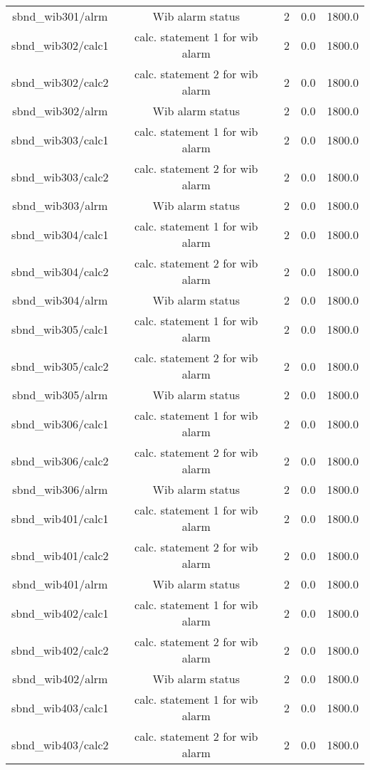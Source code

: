\begin{center}
\begin{longtable}{c | c c c c }
sbnd\_wib301/alrm & Wib alarm status & 2 & 0.0 & 1800.0\\ 
sbnd\_wib302/calc1 & calc. statement 1 for wib alarm & 2 & 0.0 & 1800.0\\ 
sbnd\_wib302/calc2 & calc. statement 2 for wib alarm & 2 & 0.0 & 1800.0\\ 
sbnd\_wib302/alrm & Wib alarm status & 2 & 0.0 & 1800.0\\ 
sbnd\_wib303/calc1 & calc. statement 1 for wib alarm & 2 & 0.0 & 1800.0\\ 
sbnd\_wib303/calc2 & calc. statement 2 for wib alarm & 2 & 0.0 & 1800.0\\ 
sbnd\_wib303/alrm & Wib alarm status & 2 & 0.0 & 1800.0\\ 
sbnd\_wib304/calc1 & calc. statement 1 for wib alarm & 2 & 0.0 & 1800.0\\ 
sbnd\_wib304/calc2 & calc. statement 2 for wib alarm & 2 & 0.0 & 1800.0\\ 
sbnd\_wib304/alrm & Wib alarm status & 2 & 0.0 & 1800.0\\ 
sbnd\_wib305/calc1 & calc. statement 1 for wib alarm & 2 & 0.0 & 1800.0\\ 
sbnd\_wib305/calc2 & calc. statement 2 for wib alarm & 2 & 0.0 & 1800.0\\ 
sbnd\_wib305/alrm & Wib alarm status & 2 & 0.0 & 1800.0\\ 
sbnd\_wib306/calc1 & calc. statement 1 for wib alarm & 2 & 0.0 & 1800.0\\ 
sbnd\_wib306/calc2 & calc. statement 2 for wib alarm & 2 & 0.0 & 1800.0\\ 
sbnd\_wib306/alrm & Wib alarm status & 2 & 0.0 & 1800.0\\ 
sbnd\_wib401/calc1 & calc. statement 1 for wib alarm & 2 & 0.0 & 1800.0\\ 
sbnd\_wib401/calc2 & calc. statement 2 for wib alarm & 2 & 0.0 & 1800.0\\ 
sbnd\_wib401/alrm & Wib alarm status & 2 & 0.0 & 1800.0\\ 
sbnd\_wib402/calc1 & calc. statement 1 for wib alarm & 2 & 0.0 & 1800.0\\ 
sbnd\_wib402/calc2 & calc. statement 2 for wib alarm & 2 & 0.0 & 1800.0\\ 
sbnd\_wib402/alrm & Wib alarm status & 2 & 0.0 & 1800.0\\ 
sbnd\_wib403/calc1 & calc. statement 1 for wib alarm & 2 & 0.0 & 1800.0\\ 
sbnd\_wib403/calc2 & calc. statement 2 for wib alarm & 2 & 0.0 & 1800.0\\ 

\end{longtable}
\end{center}
